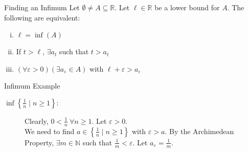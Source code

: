 \documentclass[8pt]{extarticle}
\newcommand{\N}{\mathbb{N}}
\newcommand{\R}{\mathbb{R}}
\begin{document}
  \begin{problem}{Finding an Infimum}
    Let $\emptyset \neq A \subseteq \R$. Let $\ell \in \R$ be a lower bound for $A$. The following are equivalent:
    \begin{enumerate}[(i)]
      \item $\ell = \inf(A)$
      \item If $t > \ell$, $\exists a_t$ such that $t > a_t$
      \item $(\forall \varepsilon > 0)(\exists a_{\varepsilon}\in A)$ with $\ell + \varepsilon > a_{\varepsilon}$
    \end{enumerate}
  \end{problem}
  \begin{problem}{Infimum Example}
    \begin{description}
      \item[$\inf\left\{\frac{1}{n}\mid n\geq 1\right\}:$] Clearly, $0 < \frac{1}{n}~\forall n \geq 1$. Let $\varepsilon > 0$.\\

        We need to find $a\in\left\{\frac{1}{n}\mid n\geq 1\right\}$ with $\varepsilon > a$. By the Archimedean Property, $\exists m\in\N$ such that $\frac{1}{m} < \varepsilon$. Let $a_{\varepsilon} = \frac{1}{m}$.
    \end{description}
  \end{problem}
\end{document}
